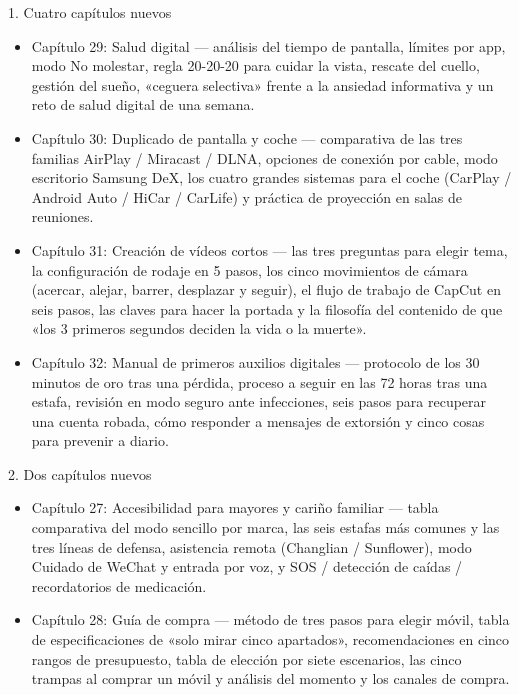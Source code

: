 
1. Cuatro capítulos nuevos

\begin{itemize}
  \item Capítulo 29: Salud digital — análisis del tiempo de pantalla, límites por app, modo No molestar, regla 20-20-20 para cuidar la vista, rescate del cuello, gestión del sueño, «ceguera selectiva» frente a la ansiedad informativa y un reto de salud digital de una semana.
  \item Capítulo 30: Duplicado de pantalla y coche — comparativa de las tres familias AirPlay / Miracast / DLNA, opciones de conexión por cable, modo escritorio Samsung DeX, los cuatro grandes sistemas para el coche (CarPlay / Android Auto / HiCar / CarLife) y práctica de proyección en salas de reuniones.
  \item Capítulo 31: Creación de vídeos cortos — las tres preguntas para elegir tema, la configuración de rodaje en 5 pasos, los cinco movimientos de cámara (acercar, alejar, barrer, desplazar y seguir), el flujo de trabajo de CapCut en seis pasos, las claves para hacer la portada y la filosofía del contenido de que «los 3 primeros segundos deciden la vida o la muerte».
  \item Capítulo 32: Manual de primeros auxilios digitales — protocolo de los 30 minutos de oro tras una pérdida, proceso a seguir en las 72 horas tras una estafa, revisión en modo seguro ante infecciones, seis pasos para recuperar una cuenta robada, cómo responder a mensajes de extorsión y cinco cosas para prevenir a diario.
\end{itemize}

2. Dos capítulos nuevos

\begin{itemize}
  \item Capítulo 27: Accesibilidad para mayores y cariño familiar — tabla comparativa del modo sencillo por marca, las seis estafas más comunes y las tres líneas de defensa, asistencia remota (Changlian / Sunflower), modo Cuidado de WeChat y entrada por voz, y SOS / detección de caídas / recordatorios de medicación.
  \item Capítulo 28: Guía de compra — método de tres pasos para elegir móvil, tabla de especificaciones de «solo mirar cinco apartados», recomendaciones en cinco rangos de presupuesto, tabla de elección por siete escenarios, las cinco trampas al comprar un móvil y análisis del momento y los canales de compra.
\end{itemize}

